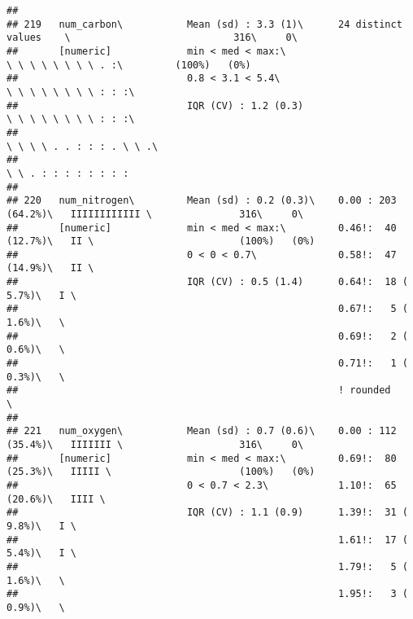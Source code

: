 \documentclass[]{article}
\begin{document}
\begin{verbatim}
## 
## 219   num_carbon\           Mean (sd) : 3.3 (1)\      24 distinct values    \                            316\     0\       
##       [numeric]             min < med < max:\                               \ \ \ \ \ \ \ \ . :\         (100%)   (0%)     
##                             0.8 < 3.1 < 5.4\                                \ \ \ \ \ \ \ \ : : :\                         
##                             IQR (CV) : 1.2 (0.3)                            \ \ \ \ \ \ \ \ : : :\                         
##                                                                             \ \ \ \ . . : : : . \ \ .\                     
##                                                                             \ \ . : : : : : : : :                          
## 
## 220   num_nitrogen\         Mean (sd) : 0.2 (0.3)\    0.00 : 203 (64.2%)\   IIIIIIIIIIII \               316\     0\       
##       [numeric]             min < med < max:\         0.46!:  40 (12.7%)\   II \                         (100%)   (0%)     
##                             0 < 0 < 0.7\              0.58!:  47 (14.9%)\   II \                                           
##                             IQR (CV) : 0.5 (1.4)      0.64!:  18 ( 5.7%)\   I \                                            
##                                                       0.67!:   5 ( 1.6%)\   \                                              
##                                                       0.69!:   2 ( 0.6%)\   \                                              
##                                                       0.71!:   1 ( 0.3%)\   \                                              
##                                                       ! rounded             \                                              
## 
## 221   num_oxygen\           Mean (sd) : 0.7 (0.6)\    0.00 : 112 (35.4%)\   IIIIIII \                    316\     0\       
##       [numeric]             min < med < max:\         0.69!:  80 (25.3%)\   IIIII \                      (100%)   (0%)     
##                             0 < 0.7 < 2.3\            1.10!:  65 (20.6%)\   IIII \                                         
##                             IQR (CV) : 1.1 (0.9)      1.39!:  31 ( 9.8%)\   I \                                            
##                                                       1.61!:  17 ( 5.4%)\   I \                                            
##                                                       1.79!:   5 ( 1.6%)\   \                                              
##                                                       1.95!:   3 ( 0.9%)\   \                                              

\end{verbatim}
\end{document}
